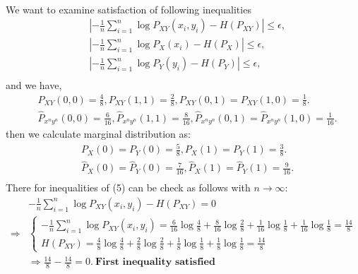 \documentclass[
  course = {{EE623 Information Theory}},
  quartile = {{4}},
  assignment = 6,
  name = {{Mohammad Mahdi Rahimi}},
  studentnumber = {{20208244}},
  email = {{mahi@kaist.ac.kr}},
  firstexercise = 1
]{aga-homework}
\begin{document}
\\
\exercise
\\\\
We want to examine satisfaction of following inequalities
\begin{equation} \label{eq3}
\begin{split}
&\left|- \frac{1}{n} \sum_{i=1}^{n} \log{P_{XY}(x_i, y_i)} - H(P_{XY})\right| \le \epsilon,\\
&\left| - \frac{1}{n} \sum_{i=1}^{n} \log{P_X(x_i)} - H(P_X)\right| \le \epsilon,\\
&\left| - \frac{1}{n} \sum_{i=1}^{n} \log{P_Y(y_i)} - H(P_Y)\right| \le \epsilon,\\
\end{split}
\end{equation}
and we have,
\begin{equation} \label{eq3}
\begin{split}
& P_{XY}(0,0) = \frac{4}{8},P_{XY}(1,1) = \frac{2}{8},P_{XY}(0,1) = P_{XY}(1,0) = \frac{1}{8}. \\
& \hat{P}_{x^ny^n}(0,0) = \frac{6}{16},\hat{P}_{x^ny^n}(1,1) = \frac{8}{16},\hat{P}_{x^ny^n}(0,1) = \hat{P}_{x^ny^n}(1,0) = \frac{1}{16}. 
\end{split}
\end{equation}
then we calculate marginal distribution as:
\begin{equation} \label{eq3}
\begin{split}
& P_{X}(0) = P_{Y}(0) = \frac{5}{8},P_{X}(1) = P_{Y}(1) = \frac{3}{8}. \\
& \hat{P}_{X}(0) = \hat{P}_{Y}(0) = \frac{7}{16},\hat{P}_{X}(1) = \hat{P}_{Y}(1) = \frac{9}{16}. \\
\end{split}
\end{equation}
There for inequalities of (5) can be check as follows with $n \rightarrow \infty$:
\begin{equation} \label{eq3}
\begin{split}
& -\frac{1}{n} \sum_{i=1}^{n} \log{P_{XY}(x_i, y_i)} - H(P_{XY}) = 0 \\
\Rightarrow & \begin{cases}
-\frac{1}{n} \sum_{i=1}^{n} \log{P_{XY}(x_i, y_i)} = \frac{6}{16}\log\frac{4}{8} + \frac{8}{16}\log\frac{2}{8} + \frac{1}{16}\log\frac{1}{8} + \frac{1}{16}\log\frac{1}{8} = \frac{14}{8}\\
H(P_{XY}) = \frac{4}{8}\log\frac{4}{8} + \frac{2}{8}\log\frac{2}{8} + \frac{1}{8}\log\frac{1}{8} + \frac{1}{8}\log\frac{1}{8} = \frac{14}{8}
\end{cases}\\
& \Rightarrow \frac{14}{8} - \frac{14}{8} = 0.\ \textbf{First inequality satisfied}
\end{split}
\end{equation}
\end{document}

